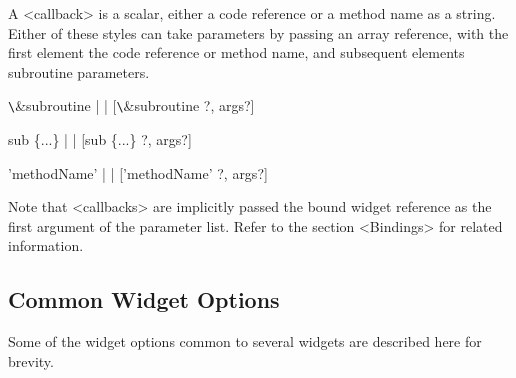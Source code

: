 A <callback> is a scalar, either a code reference or a method name as a
string.  Either of these styles can take parameters by passing an array reference,
with the first element the code reference or method name, and subsequent
elements subroutine parameters.

\verb+\+\&subroutine |     | [\verb+\+\&subroutine ?, args?]

sub \{...\} |        | [sub \{...\} ?, args?]

'methodName' |    |  ['methodName' ?, args?]

Note that  <callbacks> are implicitly passed the bound widget reference
as the first argument of the parameter list.  Refer to the section <Bindings>
for related information.

\subsection*{Common Widget Options}

Some of the widget options common to several widgets are described
here for brevity.

